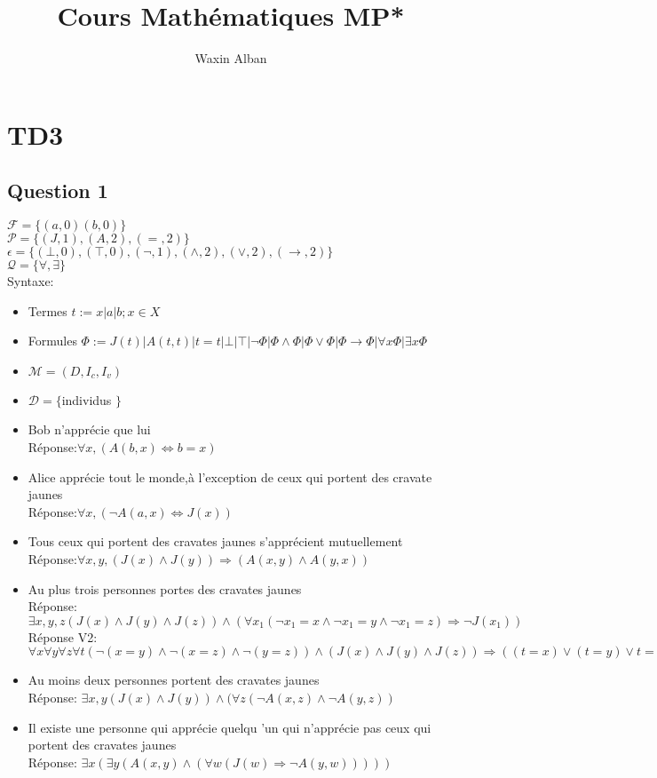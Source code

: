 \documentclass[12pt]{report}
\title{Cours Mathématiques MP*}
\author{Waxin Alban}
\begin{document}
\chapter{TD3}

\section{Question 1}

$\mathcal{F} = \lbrace (a,0) (b,0) \rbrace$\\
$\mathcal{P} = \lbrace (J,1),(A,2),(=,2) \rbrace$\\
$\mathcal{\epsilon} = \lbrace (\bot,0),(\top,0),(\neg,1),(\wedge,2),(\vee,2), (\to,2)  \rbrace$\\
$\mathcal{Q} = \lbrace \forall, \exists \rbrace$\\
Syntaxe:
\begin{itemize}
\item Termes $t := x|a|b ;  x \in X$
\item Formules $\Phi := J(t) |A(t,t)|t =t| \bot | \top | \neg \Phi | \Phi \wedge \Phi| \Phi \vee \Phi | \Phi \to \Phi | \forall x \Phi| \exists x \Phi$
\item $\mathcal{M} = (D ,I_c, I_v)$
\item $\mathcal{D} = \lbrace $individus $\rbrace $
\end{itemize}
\begin{itemize}
\item Bob n'apprécie que lui\\
		Réponse:$\forall x  ,(A(b,x) \Leftrightarrow b =x)$\\

\item Alice apprécie tout le monde,à l'exception de ceux qui portent des cravate jaunes\\
		Réponse:$\forall x  ,(\neg A(a,x) \Leftrightarrow J(x))$\\

\item Tous ceux qui portent des cravates jaunes s'apprécient mutuellement\\
Réponse:$\forall x ,y , (J(x) \wedge J(y)) \Rightarrow (A(x,y) \wedge A(y,x))$
\item Au plus trois personnes portes des cravates jaunes\\
		Réponse:$\exists x ,y ,z  (J(x) \wedge J(y) \wedge J(z)) \wedge (\forall  x_1 (\neg x_1 = x \wedge \neg x_1 = y \wedge \neg x_1 = z)\Rightarrow\neg J(x_1))$\\
		Réponse V2:   $ \forall x \forall y \forall z \forall t ( \neg (x = y) \wedge \neg ( x = z) \wedge \neg (y = z)) \wedge (J(x) \wedge J(y) \wedge J(z)) \Rightarrow ((t=x) \vee (t=y) \vee t =z))$
\item Au moins deux personnes portent des cravates jaunes\\
Réponse: $\exists x,y (J(x) \wedge J(y)) \wedge (\forall z (\neg A(x,z) \wedge \neg A(y,z))$
\item Il existe une personne qui apprécie quelqu 'un qui n'apprécie pas ceux qui portent des cravates jaunes\\
Réponse: $ \exists x ( \exists y ( A(x,y) \wedge (\forall w ( J(w) \Rightarrow \neg A(y,w)))))$
\end{itemize}
\end{document}
